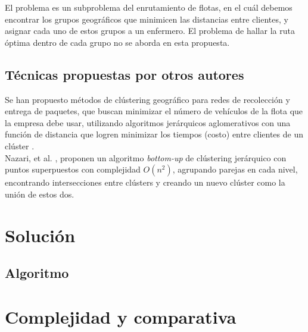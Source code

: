 \documentclass[runningheads]{llncs}
\begin{document}
El problema es un subproblema del enrutamiento de flotas, en el cuál debemos encontrar
los grupos geográficos que minimicen las distancias entre clientes, y asignar cada uno
de estos grupos a un enfermero. El problema de hallar la ruta óptima dentro de cada
grupo no se aborda en esta propuesta.
\subsection{Técnicas propuestas por otros autores}
Se han propuesto métodos de clústering geográfico para redes de recolección y entrega
de paquetes, que buscan minimizar el número de vehículos de la flota que
la empresa debe usar, utilizando algoritmos jerárquicos aglomerativos con una función
de distancia que logren minimizar los tiempos (costo) entre clientes de un clúster
\cite{bard11}.
\\
Nazari, et al. \cite{nazari19}, proponen un algoritmo \textit{bottom-up} de clústering
jerárquico con puntos superpuestos con complejidad $O(n^{2})$, agrupando parejas en cada nivel,
encontrando intersecciones entre clústers y creando un nuevo clúster como la unión de estos dos.
\section{Solución}
\subsection{Algoritmo}
\section{Complejidad y comparativa}
%
%
%
\renewcommand{\refname}{Referencias}


\end{document}
